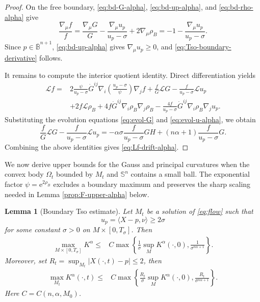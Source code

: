 \documentclass[11pt, reqno]{amsart}
\newtheorem{lemma}[theorem]{Lemma}
\theoremstyle{remark}
\theoremstyle{definition}
\numberwithin{equation}{section}
\newcommand{\B}{\mathbb B}
\begin{document}
\begin{proof}
    On the free boundary, \eqref{eq:bd-G-alpha}, \eqref{eq:bd-up-alpha}, and
\eqref{eq:bd-rho-alpha} give
\begin{equation*}
        \frac{\nabla_\mu f}{f}
        =\frac{\nabla_\mu G}{G}
          -\frac{\nabla_\mu u_p}{u_p-\sigma}
          +2\nabla_\mu\rho_B=-1-\frac{\nabla_\mu u_p}{u_p-\sigma}.
\end{equation*}
Since $p\in\overline{\B}^{n+1}$, \eqref{eq:bd-up-alpha} gives
$\nabla_\mu u_p\ge0$, and \eqref{eq:Tso-boundary-derivative} follows.

It remains to compute the interior quotient identity.  Direct differentiation yields
\begin{align*}
    \mathcal{L} f=&2\frac{\psi}{u_p-\sigma}\dot G^{ij}
        \nabla_i\!\left(\frac{u_p-\sigma}{\psi}\right)\nabla_j f
        +\frac{f}{G}\mathcal{L} G-\frac{f}{u_p-\sigma} \mathcal{L} u_p
        \nonumber\\
        &  +2f \mathcal{L}\rho_B +4f\dot G^{ij}\nabla_i\rho_B\nabla_j\rho_B
        -\frac{4f}{u_p-\sigma}\dot G^{ij}\nabla_i\rho_B\nabla_j u_p.
\end{align*}
Substituting the evolution equations \eqref{eq:evol-G} and \eqref{eq:evol-u-alpha}, we obtain
\begin{equation*}
        \frac{f}{G}\mathcal{L} G-\frac{f}{u_p-\sigma}\mathcal{L} u_p
        =-\alpha\sigma\frac{f}{u_p-\sigma}G H
          +(n\alpha+1)\frac{f}{u_p-\sigma}G.
\end{equation*}
Combining the above identities gives \eqref{eq:Lf-drift-alpha}.
\end{proof}

We now derive upper bounds for the Gauss and principal curvatures when the convex body $\Omega_t$ bounded by $M_t$ and $\mathbb{S}^n$ contains a small ball. The exponential factor $\psi=\mathrm{e}^{2\rho_B}$ excludes a boundary maximum and preserves the sharp scaling needed in Lemma \ref{prop:F-upper-alpha} below.

\begin{lemma}[Boundary Tso estimate]\label{prop:Tso-alpha}
Let $M_t$ be a solution of \eqref{eq:flow} such that
\begin{equation*}
        u_p=\langle X-p,\nu \rangle \ge  2\sigma
\end{equation*}
for some constant $\sigma>0$ on $M\times [0,T_{\sigma}]$. Then
\begin{align}
        \max_{M\times[0,T_{\sigma}]}K^\alpha
        \leq & C\max\left\{
        \frac{1}{\sigma}\sup_MK^\alpha(\cdot,0),
        \frac{1}{\sigma^{n\alpha+1}}
        \right\}. \label{eq:G-upper-Tso-alpha}
\end{align}
Moreover, set $R_t=\sup_{M_t}|X(\cdot,t)-p|\leq 2$, then
\begin{align}
  \max\limits_{M_t}K^{\alpha}(\cdot,t)  \leq& C\max\left\{
        \frac{R_t}{\sigma}\sup_MK^\alpha(\cdot,0),
        \frac{R_t}{\sigma^{n\alpha+1}}
        \right\}. \label{equ-G-upper-time}
\end{align}
Here $C=C(n,\alpha,M_0)$.
\end{lemma}
\end{document}

